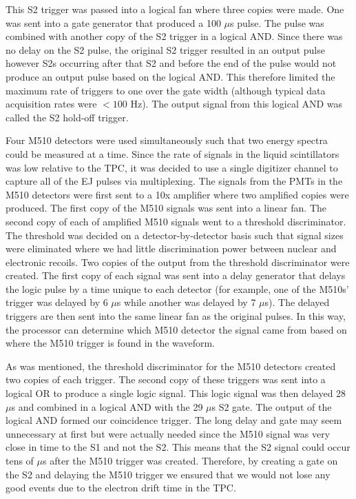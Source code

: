 This S2 trigger was passed into a logical fan where three copies were made.  One was sent into a gate generator that produced a 100 $\mu$s \nimbar{} pulse.  The \nimbar{} pulse was combined with another copy of the S2 trigger in a logical AND.  Since there was no delay on the S2 pulse, the original S2 trigger resulted in an output pulse however S2s occurring after that S2 and before the end of the \nimbar{} pulse would not produce an output pulse based on the logical AND.  This therefore limited the maximum rate of triggers to one over the gate width (although typical data acquisition rates were $< 100$ Hz).   The output signal from this logical AND was called the S2 hold-off trigger.

Four M510 detectors were used simultaneously such that two energy spectra could be measured at a time.  Since the rate of signals in the liquid scintillators was low relative to the TPC, it was decided to use a single digitizer channel to capture all of the EJ pulses via multiplexing.  The signals from the PMTs in the M510 detectors were first sent to a 10x amplifier where two amplified copies were produced.  The first copy of the M510 signals was sent into a linear fan.  The second copy of each of amplified M510 signals went to a threshold discriminator.  The threshold was decided on a detector-by-detector basis such that signal sizes were eliminated where we had little discrimination power between nuclear and electronic recoils.  Two copies of the output from the threshold discriminator were created.  The first copy of each signal was sent into a delay generator that delays the logic pulse by a time unique to each detector (for example, one of the M510s' trigger was delayed by 6 $\mu$s while another was delayed by 7 $\mu$s).  The delayed triggers are then sent into the same linear fan as the original pulses.  In this way, the processor can determine which M510 detector the signal came from based on where the M510 trigger is found in the waveform.  

As was mentioned, the threshold discriminator for the M510 detectors created two copies of each trigger.  The second copy of these triggers was sent into a logical OR to produce a single logic signal.  This logic signal was then delayed 28 $\mu$s and combined in a logical AND with the 29 $\mu$s S2 gate.  The output of the logical AND formed our coincidence trigger.  The long delay and gate may seem unnecessary at first but were actually needed since the M510 signal was very close in time to the S1 and not the S2.  This means that the S2 signal could occur tens of $\mu$s after the M510 trigger was created.  Therefore, by creating a gate on the S2 and delaying the M510 trigger we ensured that we would not lose any good events due to the electron drift time in the TPC.  




